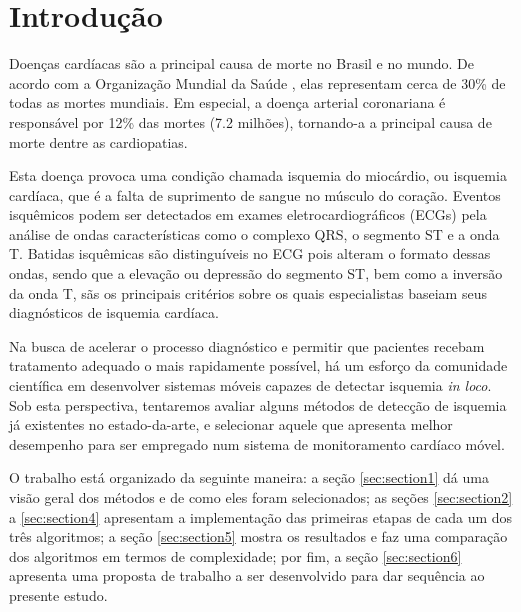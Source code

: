 
\section*{Introdução}
\label{sec:intro}

Doenças cardíacas são a principal causa de morte no Brasil e no mundo. De acordo com a Organização Mundial da Saúde \cite{Who04}, elas representam cerca de 30\% de todas as mortes mundiais. Em especial, a doença arterial coronariana é responsável por 12\% das mortes (7.2 milhões), tornando-a a principal causa de morte dentre as cardiopatias.

Esta doença provoca uma condição chamada isquemia do miocárdio, ou isquemia cardíaca, que é a falta de suprimento de sangue no músculo do coração. Eventos isquêmicos podem ser detectados em exames eletrocardiográficos (ECGs) pela análise de ondas características como o complexo QRS, o segmento ST e a onda T. Batidas isquêmicas são distinguíveis no ECG pois alteram o formato dessas ondas, sendo que a elevação ou depressão do segmento ST, bem como a inversão da onda T, sãs os principais critérios sobre os quais especialistas baseiam seus diagnósticos de isquemia cardíaca.

Na busca de acelerar o processo diagnóstico e permitir que pacientes recebam tratamento adequado o mais rapidamente possível, há um esforço da comunidade científica em desenvolver sistemas móveis capazes de detectar isquemia \emph{in loco}. Sob esta perspectiva, tentaremos avaliar alguns métodos de detecção de isquemia já existentes no estado-da-arte, e selecionar aquele que apresenta melhor desempenho para ser empregado num sistema de monitoramento cardíaco móvel.

O trabalho está organizado da seguinte maneira: a seção \ref{sec:section1} dá uma visão geral dos métodos e de como eles foram selecionados; as seções \ref{sec:section2} a \ref{sec:section4} apresentam a implementação das primeiras etapas de cada um dos três algoritmos; a seção \ref{sec:section5} mostra os resultados e faz uma comparação dos algoritmos em termos de complexidade; por fim, a seção \ref{sec:section6} apresenta uma proposta de trabalho a ser desenvolvido para dar sequência ao presente estudo.
